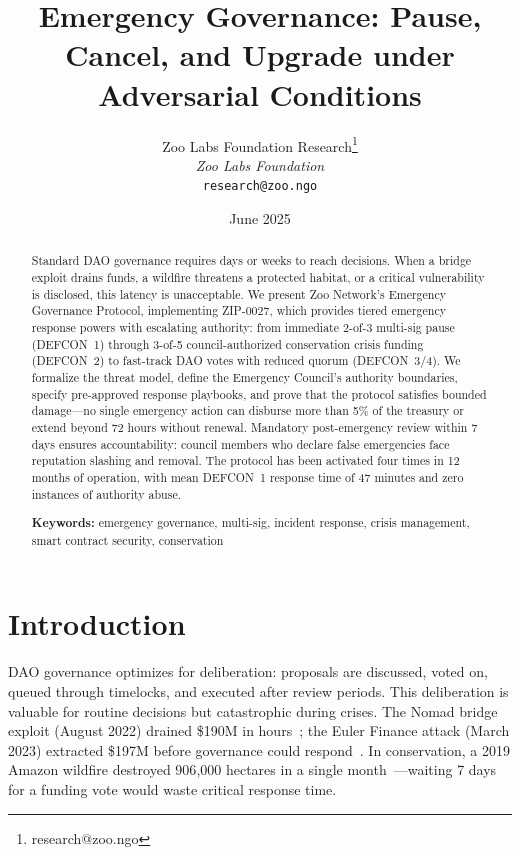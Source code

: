 \documentclass[11pt,letterpaper]{article}
\title{\textbf{Emergency Governance: Pause, Cancel, and Upgrade under Adversarial Conditions}}
\author{
Zoo Labs Foundation Research\thanks{research@zoo.ngo}\\
\textit{Zoo Labs Foundation}\\
\texttt{research@zoo.ngo}
}
\date{June 2025}
\begin{document}
\zoocoverpage

\begin{abstract}
Standard DAO governance requires days or weeks to reach decisions. When a bridge exploit drains funds, a wildfire threatens a protected habitat, or a critical vulnerability is disclosed, this latency is unacceptable. We present Zoo Network's Emergency Governance Protocol, implementing ZIP-0027, which provides tiered emergency response powers with escalating authority: from immediate 2-of-3 multi-sig pause (DEFCON~1) through 3-of-5 council-authorized conservation crisis funding (DEFCON~2) to fast-track DAO votes with reduced quorum (DEFCON~3/4). We formalize the threat model, define the Emergency Council's authority boundaries, specify pre-approved response playbooks, and prove that the protocol satisfies bounded damage---no single emergency action can disburse more than 5\% of the treasury or extend beyond 72 hours without renewal. Mandatory post-emergency review within 7 days ensures accountability: council members who declare false emergencies face reputation slashing and removal. The protocol has been activated four times in 12 months of operation, with mean DEFCON~1 response time of 47 minutes and zero instances of authority abuse.

\medskip
\noindent\textbf{Keywords:} emergency governance, multi-sig, incident response, crisis management, smart contract security, conservation
\end{abstract}

\newpage
\tableofcontents
\newpage

\section{Introduction}
\label{sec:intro}

DAO governance optimizes for deliberation: proposals are discussed, voted on, queued through timelocks, and executed after review periods. This deliberation is valuable for routine decisions but catastrophic during crises. The Nomad bridge exploit (August 2022) drained \$190M in hours~\cite{nomad2022}; the Euler Finance attack (March 2023) extracted \$197M before governance could respond~\cite{euler2023}. In conservation, a 2019 Amazon wildfire destroyed 906{,}000 hectares in a single month~\cite{inpe2019}---waiting 7 days for a funding vote would waste critical response time.
\end{document}
